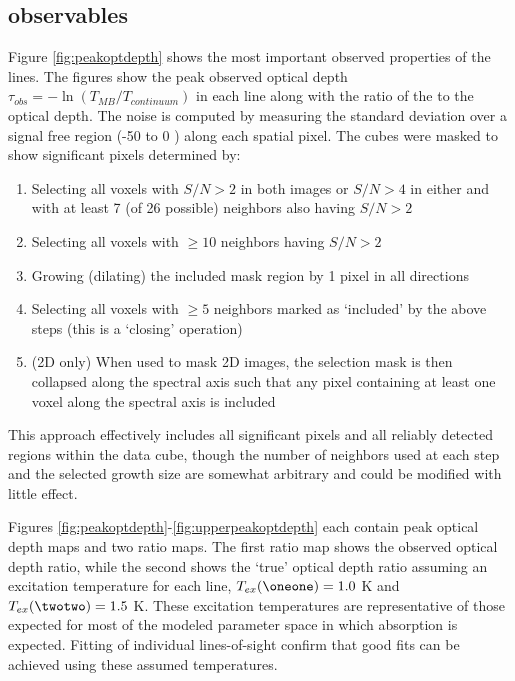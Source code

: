 \subsection{\formaldehyde observables}
\label{sec:h2co}

Figure \ref{fig:peakoptdepth} shows the most important observed properties of
the \formaldehyde lines.  The figures show the peak observed optical depth
$\tau_{obs} = -\ln(T_{MB}/T_{continuum})$ in each line along with the ratio of
the \oneone to the \twotwo optical depth.  The noise is computed by measuring
the standard deviation over a signal free region (-50 to 0 \kms) along each
spatial pixel.  The cubes were masked to show significant pixels determined by:
\begin{enumerate}
    \item Selecting all voxels with $S/N > 2$ in both images or $S/N > 4$ in
        either and with at least 7 (of 26 possible) neighbors also having $S/N > 2$ 
    \item Selecting all voxels with $\ge10$ neighbors having $S/N > 2$
    \item Growing (dilating) the included mask region by 1 pixel in all
        directions
    \item Selecting all voxels with $\ge5$ neighbors marked as `included' by the
        above steps (this is a `closing' operation)
    \item (2D only) When used to mask 2D images, the selection mask is then
        collapsed along the spectral axis such that any pixel containing at
        least one voxel along the spectral axis is included
\end{enumerate}
This approach effectively includes all significant pixels and all reliably
detected regions within the data cube, though the number of neighbors used at
each step and the selected growth size are somewhat arbitrary and could be
modified with little effect.

Figures \ref{fig:peakoptdepth}-\ref{fig:upperpeakoptdepth} each contain
peak optical depth maps and two ratio maps.  The first ratio map shows the observed
optical depth ratio, while the second shows the `true' optical depth
ratio assuming an excitation temperature for each line, $T_{ex}(\oneone) = 1.0$
K and $T_{ex}(\twotwo) = 1.5$ K.  These excitation temperatures are
representative of those expected for most of the modeled parameter space in
which absorption is expected.  Fitting of individual lines-of-sight confirm
that good fits can be achieved using these assumed temperatures.


